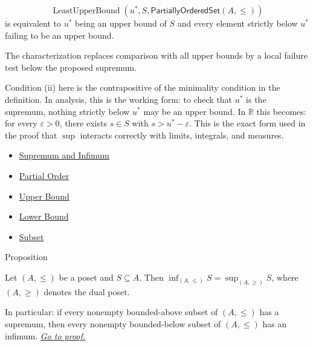 \begin{remark*}
\[
  \operatorname{LeastUpperBound}(u^*,S,\mathsf{PartiallyOrderedSet}(A,\leq))
\]
is equivalent to $u^*$ being an upper bound of $S$ and every element strictly
below $u^*$ failing to be an upper bound.
\end{remark*}

\begin{remark*}[Interpretation]
The characterization replaces comparison with all upper bounds by a local
failure test below the proposed supremum.
\end{remark*}

\begin{remark*}[Exposition]
Condition (ii) here is the contrapositive of the minimality condition in
the definition. In analysis, this is the working form: to check that $u^*$ is
the supremum, nothing strictly below $u^*$ may be an
upper bound.  In $\mathbb{R}$ this becomes: for every $\varepsilon > 0$,
there exists $s \in S$ with $s > u^* - \varepsilon$.  This is the exact
form used in the proof that $\sup$ interacts correctly with limits,
integrals, and measures.
\end{remark*}

\begin{dependencies}
\begin{itemize}
  \item \hyperref[def:sup-inf]{Supremum and Infimum}
  \item \hyperref[def:partial-order]{Partial Order}
  \item \hyperref[def:upper-bound]{Upper Bound}
  \item \hyperref[def:lower-bound]{Lower Bound}
  \item \hyperref[def:subset]{Subset}
\end{itemize}
\end{dependencies}


\begin{propositionbox}{Proposition}
\begin{proposition}
\label{prop:sup-inf-duality}
Let $(A, \leq)$ be a poset and $S \subseteq A$.  Then
$\inf_{(A,\leq)} S = \sup_{(A,\geq)} S$,
where $(A,\geq)$ denotes the dual poset.

In particular: if every nonempty bounded-above subset of $(A,\leq)$ has a
supremum, then every nonempty bounded-below subset of $(A,\leq)$ has an
infimum.
\hyperref[prf:sup-inf-duality]{\textit{Go to proof.}}
\end{proposition}
\end{propositionbox}

